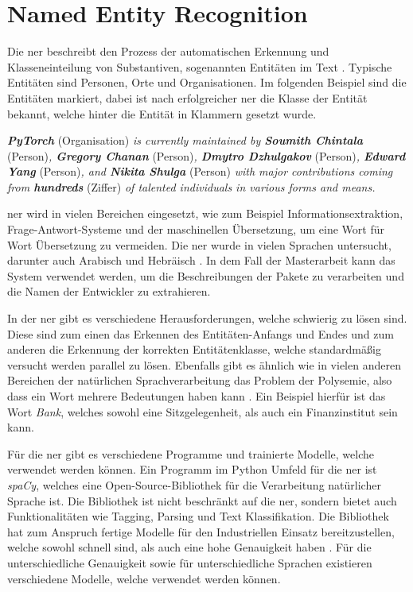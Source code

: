 \section{Named Entity Recognition}
\label{sec:named-entity-recognition}
Die \gls{ner} beschreibt den Prozess der automatischen Erkennung und Klasseneinteilung von Substantiven, sogenannten Entitäten im Text \autocite{mohit_named_2014}.
Typische Entitäten sind Personen, Orte und Organisationen.
Im folgenden Beispiel sind die Entitäten markiert, dabei ist nach erfolgreicher \gls{ner} die Klasse der Entität bekannt, welche hinter die Entität in Klammern gesetzt wurde.

\begin{addmargin}[25pt]{0pt}
    \textit{\textbf{PyTorch}} (Organisation) \textit{is currently maintained by \textbf{Soumith Chintala}} (Person)\textit{, \textbf{Gregory Chanan}} (Person)\textit{, \textbf{Dmytro Dzhulgakov}} (Person)\textit{, \textbf{Edward Yang}} (Person)\textit{, and \textbf{Nikita Shulga}} (Person) \textit{with major contributions coming from \textbf{hundreds}} (Ziffer) \textit{of talented individuals in various forms and means.}
\end{addmargin}

\gls{ner} wird in vielen Bereichen eingesetzt, wie zum Beispiel Informationsextraktion, Frage-Antwort-Systeme und der maschinellen Übersetzung, um eine Wort für Wort Übersetzung zu vermeiden.
Die \gls{ner} wurde in vielen Sprachen untersucht, darunter auch Arabisch und Hebräisch \autocite{mohit_named_2014}.
In dem Fall der Masterarbeit kann das System verwendet werden, um die Beschreibungen der Pakete zu verarbeiten und die Namen der Entwickler zu extrahieren.

In der \gls{ner} gibt es verschiedene Herausforderungen, welche schwierig zu lösen sind.
Diese sind zum einen das Erkennen des Entitäten-Anfangs und Endes und zum anderen die Erkennung der korrekten Entitätenklasse, welche standardmäßig versucht werden parallel zu lösen.
Ebenfalls gibt es ähnlich wie in vielen anderen Bereichen der natürlichen Sprachverarbeitung das Problem der Polysemie, also dass ein Wort mehrere Bedeutungen haben kann \autocite{mohit_named_2014}.
Ein Beispiel hierfür ist das Wort \textit{Bank}, welches sowohl eine Sitzgelegenheit, als auch ein Finanzinstitut sein kann.

Für die \gls{ner} gibt es verschiedene Programme und trainierte Modelle, welche verwendet werden können.
Ein Programm im Python Umfeld für die \gls{ner} ist \textit{spaCy}, welches eine Open-Source-Bibliothek für die Verarbeitung natürlicher Sprache ist.
Die Bibliothek ist nicht beschränkt auf die \gls{ner}, sondern bietet auch Funktionalitäten wie Tagging, Parsing und Text Klassifikation.
Die Bibliothek hat zum Anspruch fertige Modelle für den Industriellen Einsatz bereitzustellen, welche sowohl schnell sind, als auch eine hohe Genauigkeit haben \autocite{honnibal_spacy_2020}.
Für die unterschiedliche Genauigkeit sowie für unterschiedliche Sprachen existieren verschiedene Modelle, welche verwendet werden können.
